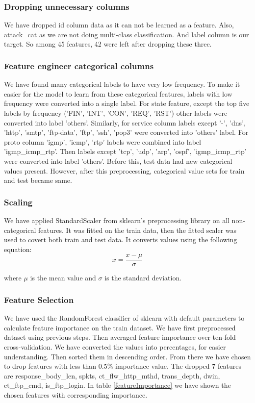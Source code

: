 \documentclass[14pt, conference]{IEEEtran}
\begin{document}
\subsubsection{Dropping unnecessary columns}
We have dropped id column data as it can not be learned as a feature. Also, attack\_cat as we are not doing multi-class
classification. And label column is our target. So among 45 features, 42 were left after dropping these three.

\subsubsection{Feature engineer categorical columns}
We have found many categorical labels to have very low frequency. To make it easier for the model to learn from these
categorical features, labels with low frequency were converted into a single label. For state feature, except
the top five labels by frequency ('FIN', 'INT', 'CON', 'REQ', 'RST') other labels were converted into label 'others'.
Similarly, for service column labels except '-', 'dns', 'http', 'smtp', 'ftp-data', 'ftp', 'ssh', 'pop3' were converted
into 'others' label. For proto column 'igmp', 'icmp', 'rtp' labels were combined into label 'igmp\_icmp\_rtp'.
Then labels except 'tcp', 'udp', 'arp', 'ospf', 'igmp\_icmp\_rtp' were converted into label 'others'. Before this, test data had new categorical values present. However, after this preprocessing, categorical value sets for train and test became same.


\subsubsection{Scaling}
We have applied StandardScaler from sklearn's preprocessing library on all non-categorical features. It was
fitted on the train data, then the fitted scaler was used to covert both train and test data. It converts values
using the following equation:
\begin{equation}
    x = \frac{x-\mu}{\sigma}
\end{equation}

where $\mu$ is the mean value and $\sigma$ is the standard deviation.

\subsubsection{Feature Selection}
We have used the RandomForest classifier of sklearn with default parameters to calculate feature importance on the
train dataset. We have first preprocessed dataset using previous steps. Then averaged feature importance over ten-fold
cross-validation. We have converted the values into percentages, for easier understanding. Then sorted them in descending order.
From there we have chosen to drop features with less than 0.5\% importance value. The dropped 7 features are response\_body\_len,
spkts, ct\_flw\_http\_mthd, trans\_depth, dwin, ct\_ftp\_cmd, is\_ftp\_login. In table \ref{featureImportance}
we have shown the chosen features with corresponding importance.
\end{document}
